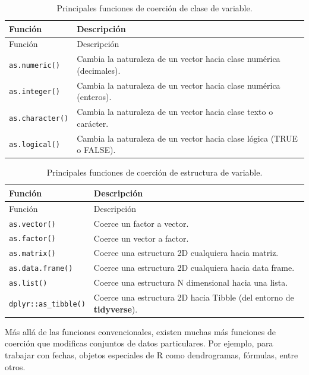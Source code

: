 \documentclass[
]{article}
\theoremstyle{definition}
\theoremstyle{definition}
\theoremstyle{definition}
\theoremstyle{definition}
\theoremstyle{remark}
\begin{document}
\begin{longtable}[]{@{}ll@{}}
\caption{\label{tab:unnamed-chunk-43}Principales funciones de coerción de clase de variable.}\tabularnewline
\toprule()
Función & Descripción \\
\midrule()
\endfirsthead
\toprule()
Función & Descripción \\
\midrule()
\endhead
\texttt{as.numeric()} & Cambia la naturaleza de un vector hacia clase numérica (decimales). \\
\texttt{as.integer()} & Cambia la naturaleza de un vector hacia clase numérica (enteros). \\
\texttt{as.character()} & Cambia la naturaleza de un vector hacia clase texto o carácter. \\
\texttt{as.logical()} & Cambia la naturaleza de un vector hacia clase lógica (TRUE o FALSE). \\
\bottomrule()
\end{longtable}

\begin{longtable}[]{@{}ll@{}}
\caption{\label{tab:unnamed-chunk-44}Principales funciones de coerción de estructura de variable.}\tabularnewline
\toprule()
Función & Descripción \\
\midrule()
\endfirsthead
\toprule()
Función & Descripción \\
\midrule()
\endhead
\texttt{as.vector()} & Coerce un factor a vector. \\
\texttt{as.factor()} & Coerce un vector a factor. \\
\texttt{as.matrix()} & Coerce una estructura 2D cualquiera hacia matriz. \\
\texttt{as.data.frame()} & Coerce una estructura 2D cualquiera hacia data frame. \\
\texttt{as.list()} & Coerce una estructura N dimensional hacia una lista. \\
\texttt{dplyr::as\_tibble()} & Coerce una estructura 2D hacia Tibble (del entorno de \textbf{tidyverse}). \\
\bottomrule()
\end{longtable}

Más allá de las funciones convencionales, existen muchas más funciones de coerción que modificas conjuntos de datos particulares. Por ejemplo, para trabajar con fechas, objetos especiales de R como dendrogramas, fórmulas, entre otros.
\end{document}
